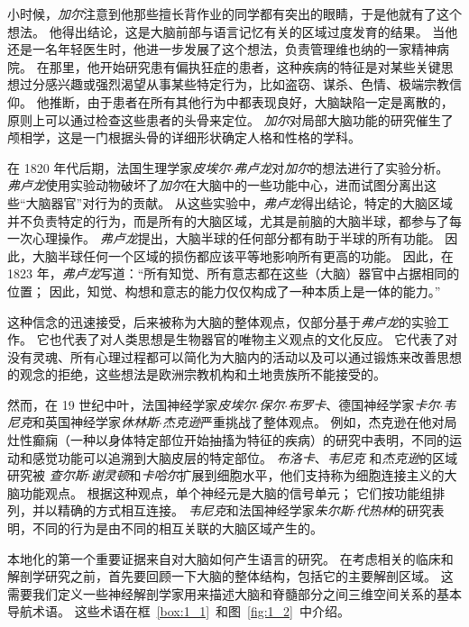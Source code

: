 小时候，\textit{加尔}注意到他那些擅长背作业的同学都有突出的眼睛，于是他就有了这个想法。
他得出结论，这是大脑前部与语言记忆有关的区域过度发育的结果。
当他还是一名年轻医生时，他进一步发展了这个想法，负责管理维也纳的一家精神病院。
在那里，他开始研究患有偏执狂症的患者，这种疾病的特征是对某些关键思想过分感兴趣或强烈渴望从事某些特定行为，比如盗窃、谋杀、色情、极端宗教信仰。
他推断，由于患者在所有其他行为中都表现良好，大脑缺陷一定是离散的，原则上可以通过检查这些患者的头骨来定位。
\textit{加尔}对局部大脑功能的研究催生了颅相学，这是一门根据头骨的详细形状确定人格和性格的学科。


在 1820 年代后期，法国生理学家\textit{皮埃尔$\cdot$弗卢龙}对\textit{加尔}的想法进行了实验分析。 
\textit{弗卢龙}使用实验动物破坏了\textit{加尔}在大脑中的一些功能中心，进而试图分离出这些“大脑器官”对行为的贡献。
从这些实验中，\textit{弗卢龙}得出结论，特定的大脑区域并不负责特定的行为，而是所有的大脑区域，尤其是前脑的大脑半球，都参与了每一次心理操作。
\textit{弗卢龙}提出，大脑半球的任何部分都有助于半球的所有功能。
因此，大脑半球任何一个区域的损伤都应该平等地影响所有更高的功能。
因此，在 1823 年，\textit{弗卢龙}写道：“所有知觉、所有意志都在这些（大脑）器官中占据相同的位置；
因此，知觉、构想和意志的能力仅仅构成了一种本质上是一体的能力。”


这种信念的迅速接受，后来被称为大脑的整体观点，仅部分基于\textit{弗卢龙}的实验工作。
它也代表了对人类思想是生物器官的唯物主义观点的文化反应。
它代表了对没有灵魂、所有心理过程都可以简化为大脑内的活动以及可以通过锻炼来改善思想的观念的拒绝，这些想法是欧洲宗教机构和土地贵族所不能接受的。


然而，在 19 世纪中叶，法国神经学家\textit{皮埃尔$\cdot$保尔$\cdot$布罗卡}、德国神经学家\textit{卡尔$\cdot$韦尼克}和英国神经学家\textit{休林斯$\cdot$杰克逊}严重挑战了整体观点。
例如，杰克逊在他对局灶性癫痫（一种以身体特定部位开始抽搐为特征的疾病）的研究中表明，不同的运动和感觉功能可以追溯到大脑皮层的特定部位。
\textit{布洛卡}、\textit{韦尼克} 和\textit{杰克逊}的区域研究被 \textit{查尔斯$\cdot$谢灵顿}和\textit{卡哈尔}扩展到细胞水平，他们支持称为细胞连接主义的大脑功能观点。
根据这种观点，单个神经元是大脑的信号单元；
它们按功能组排列，并以精确的方式相互连接。
\textit{韦尼克}和法国神经学家\textit{朱尔斯$\cdot$代热林}的研究表明，不同的行为是由不同的相互关联的大脑区域产生的。


本地化的第一个重要证据来自对大脑如何产生语言的研究。
在考虑相关的临床和解剖学研究之前，首先要回顾一下大脑的整体结构，包括它的主要解剖区域。
这需要我们定义一些神经解剖学家用来描述大脑和脊髓部分之间三维空间关系的基本导航术语。
这些术语在框~\ref{box:1_1}~和图~\ref{fig:1_2}~中介绍。


